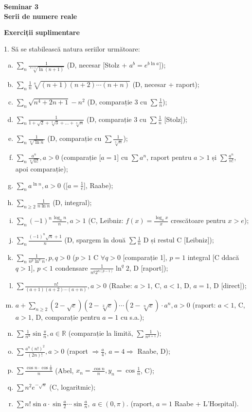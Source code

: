 \documentclass[11pt,a4paper]{article}
\newcommand\RR{\mathbb{R}}
\theoremstyle{dotless}
\theoremstyle{dotlessdr}
\begin{document}
\begin{center}
  {\large\textbf{Seminar 3 \\ Serii de numere reale}}
\end{center}

\textbf{Exerciții suplimentare}

1. Să se stabilească natura seriilor următoare:

\begin{enumerate}[(a)]
\item $\sum_n \frac{1}{\sqrt[n+1]{\ln (n + 1)}}$ (D, necesar [Stolz + $a^b = e^{b \ln a}$]);
\item $\sum_n \frac{1}{n} \sqrt[n]{(n + 1)(n + 2) \cdots (n + n)}$ (D, necesar + raport);
\item $\sum_n \sqrt{n^4 + 2n + 1} - n^2$ (D, comparație 3 cu $\sum \frac{1}{n}$);
\item $\sum_n \frac{1}{1 + \sqrt{2} + \sqrt[3]{3} + \dots + \sqrt[n]{n}}$ (D, comparație 3 cu $\sum \frac{1}{n}$ [Stolz]);
\item $\sum_n \frac{1}{\sqrt[n]{\ln n}}$ (D, comparație cu $\sum \frac{1}{\sqrt[n]{n}}$);
\item $\sum_n \frac{a^n}{\sqrt[n]{n!}}, a > 0$
  (comparație [$a = 1$] cu $\sum a^n$, raport pentru $a > 1$ și $\sum\frac{a^n}{n!}$, apoi comparație);
\item $\sum_n a^{\ln n}, a > 0$ ([$a = \frac{1}{e}$], Raabe);
\item $\sum_{n \geq 2} \frac{1}{n \ln n}$ (D, integral);
\item $\sum_n (-1)^n \frac{\log_a n}{n}, a > 1$ (C, Leibniz: $f(x) = \frac{\log_a x}{x}$ crescătoare pentru $x > e$);
\item $\sum_n \frac{(-1)^n \sqrt{n} + 1}{n}$ (D, spargem în două $\sum \frac{1}{n}$ D și restul C [Leibniz]);
\item $\sum_n \frac{1}{n^p \ln^q n}, p, q > 0$ ($p > 1$ C $\forall q > 0$ [comparație 1], $p = 1$ integral [C ddacă $q > 1$],
  $p < 1$ condensare $\frac{1}{n^q 2^{n(p-1)}} \ln^q 2$, D [raport]);
\item $\sum \frac{n!}{(a + 1)(a + 2) \cdots (a + n)}, a > 0$ (Raabe: $a > 1$, C, $a < 1$, D, $a = 1$, D [direct]);
\item $a + \sum_{n \geq 2} (2 - \sqrt{e})(2 - \sqrt[3]{e}) \cdots (2 - \sqrt[n]{e}) \cdot a^n, a > 0$
  (raport: $a < 1$, C, $a > 1$, D, comparație pentru $a = 1$ cu s.a.);
\item $\sum \frac{1}{n^a} \sin \frac{\pi}{n}, a \in \RR$ (comparație la limită, $\sum \frac{1}{n^{a + 1}}$);
\item $\sum \frac{a^n (n!)^2}{(2n)!}, a > 0$ (raport $\Rightarrow \frac{a}{4}$, $a = 4 \Rightarrow$ Raabe, D);
\item $\sum \frac{\cos n \cdot \cos \frac{1}{n}}{n}$ (Abel, $x_n = \frac{\cos n}{n}, y_n = \cos \frac{1}{n}$, C);
\item $\sum n^2 e^{-\sqrt{n}}$ (C, logaritmic);
\item $\sum n! \sin a \cdot \sin \frac{a}{2} \cdots \sin \frac{a}{n}, \ a \in (0, \pi)$. (raport, $a = 1$ Raabe + L'Hospital).
\end{enumerate}
\end{document}
